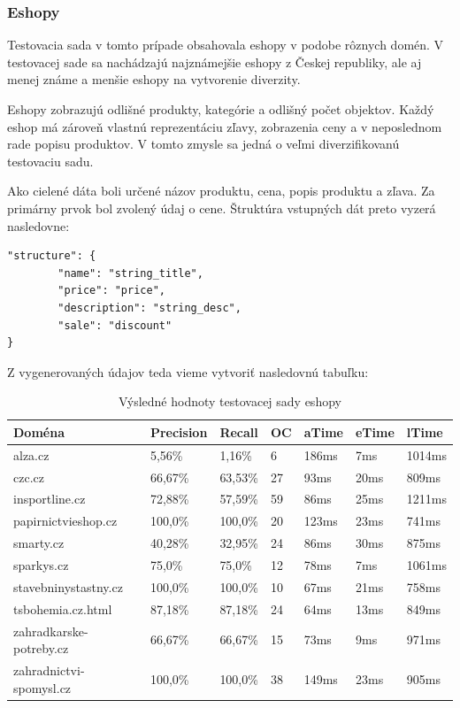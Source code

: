 \newpage

\subsubsection{Eshopy}

Testovacia sada v tomto prípade obsahovala eshopy v podobe rôznych domén. V testovacej sade sa nachádzajú najznámejšie eshopy z Českej republiky, ale aj menej známe a menšie eshopy na vytvorenie diverzity.

Eshopy zobrazujú odlišné produkty, kategórie a odlišný počet objektov. Každý eshop má zároveň vlastnú reprezentáciu zľavy, zobrazenia ceny a v neposlednom rade popisu produktov. V tomto zmysle sa jedná o veľmi diverzifikovanú testovaciu sadu.

\bigskip

Ako cielené dáta boli určené názov produktu, cena, popis produktu a zľava. Za primárny prvok bol zvolený údaj o cene. Štruktúra vstupných dát preto vyzerá nasledovne:

\bigskip

\begin{lstlisting}
"structure": {
        "name": "string_title",
        "price": "price",
        "description": "string_desc",
        "sale": "discount"
}
\end{lstlisting}

\bigskip

Z vygenerovaných údajov teda vieme vytvoriť nasledovnú tabuľku:

\begin{table}[hbt]
\caption{Výsledné hodnoty testovacej sady eshopy}
\centering
\begin{tabular}{|l|l|l|l|l|l|l|}
\hline
Doména                  & Precision & Recall  & OC & aTime & eTime & lTime  \\ \hline
alza.cz                 & 5,56\%    & 1,16\%  & 6  & 186ms & 7ms   & 1014ms \\ \hline
czc.cz                  & 66,67\%   & 63,53\% & 27 & 93ms  & 20ms  & 809ms  \\ \hline
insportline.cz          & 72,88\%   & 57,59\% & 59 & 86ms  & 25ms  & 1211ms \\ \hline
papirnictvieshop.cz     & 100,0\%   & 100,0\% & 20 & 123ms & 23ms  & 741ms  \\ \hline
smarty.cz               & 40,28\%   & 32,95\% & 24 & 86ms  & 30ms  & 875ms  \\ \hline
sparkys.cz              & 75,0\%    & 75,0\%  & 12 & 78ms  & 7ms   & 1061ms \\ \hline
stavebninystastny.cz    & 100,0\%   & 100,0\% & 10 & 67ms  & 21ms  & 758ms  \\ \hline
tsbohemia.cz.html       & 87,18\%   & 87,18\% & 24 & 64ms  & 13ms  & 849ms  \\ \hline
zahradkarske-potreby.cz & 66,67\%   & 66,67\% & 15 & 73ms  & 9ms   & 971ms  \\ \hline
zahradnictvi-spomysl.cz & 100,0\%   & 100,0\% & 38 & 149ms & 23ms  & 905ms  \\ \hline
\end{tabular}
\end{table}

